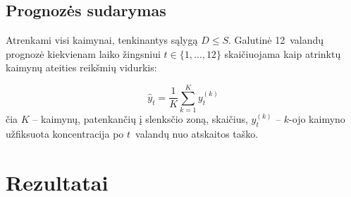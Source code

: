 \documentclass[]{VUMIFTemplateClass}
\begin{document}
    \subsection{Prognozės sudarymas}

    Atrenkami visi kaimynai, tenkinantys sąlygą $D \le S$.
    Galutinė 12~valandų  prognozė kiekvienam laiko žingsniui $t \in \{1, \dots, 12\}$ skaičiuojama kaip atrinktų kaimynų ateities reikšmių vidurkis:

    \begin{equation}
        \hat{y}_{t} = \frac{1}{K} \sum_{k=1}^{K} y_{t}^{(k)}
        \label{eq:forecast}
    \end{equation}
    čia $K$ -- kaimynų, patenkančių į slenksčio zoną, skaičius, $y_{t}^{(k)}$ -- $k$-ojo kaimyno užfiksuota  koncentracija po $t$~valandų nuo atskaitos taško.


    \section{Rezultatai}
\end{document}
